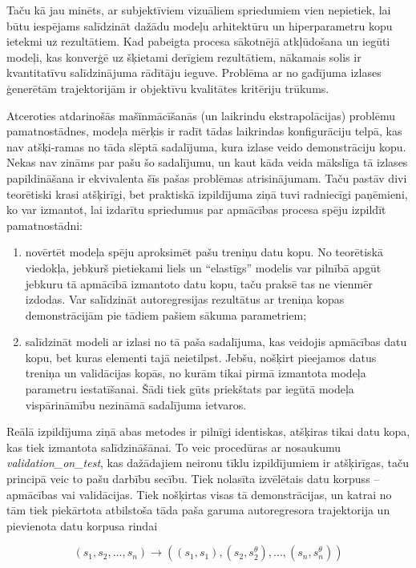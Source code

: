 \documentclass[12pt, a4paper]{article}
\numberwithin{equation}{section} %
\begin{document}
Taču kā jau minēts, ar subjektīviem vizuāliem spriedumiem vien nepietiek, lai būtu iespējams salīdzināt dažādu modeļu arhitektūru un hiperparametru kopu ietekmi uz rezultātiem. Kad pabeigta procesa sākotnējā atkļūdošana un iegūti modeļi, kas konverģē uz šķietami derīgiem rezultātiem, nākamais solis ir kvantitatīvu salīdzinājuma rādītāju ieguve. Problēma ar no gadījuma izlases ģenerētām trajektorijām ir objektīvu kvalitātes kritēriju trūkums. 

Atceroties atdarinošās mašīnmācīšanās (un laikrindu ekstrapolācijas) problēmu pamatnostādnes, modeļa mērķis ir radīt tādas laikrindas konfigurāciju telpā, kas nav atšķi-ramas no tāda slēptā sadalījuma, kura izlase veido demonstrāciju kopu. Nekas nav zināms par pašu šo sadalījumu, un kaut kāda veida mākslīga tā izlases papildināšana ir ekvivalenta šīs pašas problēmas atrisinājumam. Taču pastāv divi teorētiski krasi atšķirīgi, bet praktiskā izpildījuma ziņā tuvi radniecīgi paņēmieni, ko var izmantot, lai izdarītu spriedumus par apmācības procesa spēju izpildīt pamatnostādni:

\begin{enumerate}
    \item novērtēt modeļa spēju aproksimēt pašu treniņu datu kopu. No teorētiskā viedokļa, jebkurš pietiekami liels un ``elastīgs'' modelis var pilnībā apgūt jebkuru tā apmācībā izmantoto datu kopu, taču praksē tas ne vienmēr izdodas. Var salīdzināt autoregresijas rezultātus ar treniņa kopas demonstrācijām pie tādiem pašiem sākuma parametriem;
    \item salīdzināt modeli ar izlasi no tā paša sadalījuma, kas veidojis apmācības datu kopu, bet kuras elementi tajā neietilpst. Jebšu, nošķirt pieejamos datus treniņa un validācijas kopās, no kurām tikai pirmā izmantota modeļa parametru iestatīšanai. Šādi tiek gūts priekštats par iegūtā modeļa vispārināmību nezināmā sadalījuma ietvaros.
\end{enumerate}

Reālā izpildījuma ziņā abas metodes ir pilnīgi identiskas, atšķiras tikai datu kopa, kas tiek izmantota salīdzināšānai. To veic procedūras ar nosaukumu \textit{validation\_on\_test}, kas dažādajiem neironu tīklu izpildījumiem ir atšķirīgas, taču principā veic to pašu darbību secību. Tiek nolasīta izvēlētais datu korpuss -- apmācības vai validācijas. Tiek nošķirtas visas tā demonstrācijas, un katrai no tām tiek piekārtota atbilstoša tāda paša garuma autoregresora trajektorija un pievienota datu korpusa rindai

\begin{equation}
    (s_1, s_2, ..., s_n) \rightarrow \left ( (s_1, s_1), (s_2, s^{\theta}_2), ...,      (s_n, s^{\theta}_n) \right )
\end{equation}
\end{document}
